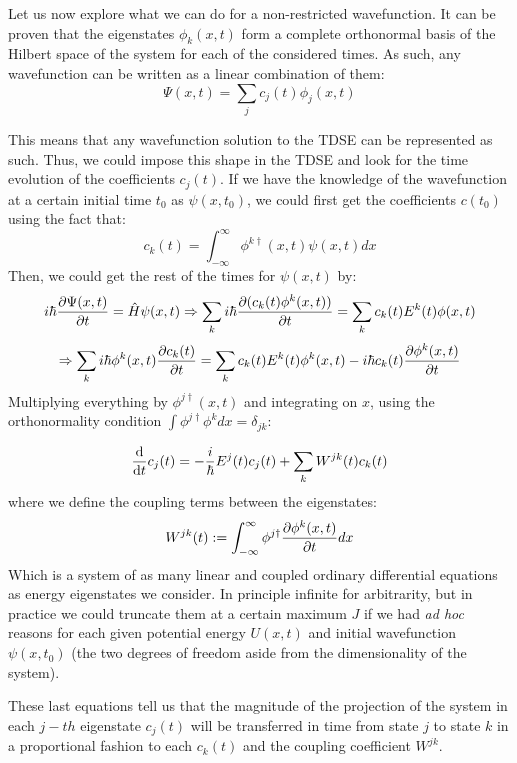 \documentclass[11pt, a4paper]{article} %
\begin{document}
Let us now explore what we can do for a non-restricted wavefunction. It can be proven that the eigenstates $\phi_k(x,t)$ form a complete orthonormal basis of the Hilbert space of the system for each of the considered times. As such, any wavefunction can be written as a linear combination of them:
\begin{equation}
\Psi(x,t)=\sum_j c_j(t)\phi_j(x,t)
\end{equation}

This means that any wavefunction solution to the TDSE can be represented as such. Thus, we could impose this shape in the TDSE and look for the time evolution of the coefficients $c_j(t)$. If we have the knowledge of the wavefunction at a certain initial time $t_0$ as $\psi(x,t_0)$, we could first get the coefficients $c(t_0)$ using the fact that:
\begin{equation}
c_k(t)=\int_{-\infty}^\infty\phi^{k \dagger}(x,t) \psi(x,t) dx
\end{equation}
Then, we could get the rest of the times for $\psi(x,t)$ by:
\begin{equation} \label{EigenE}
i\hbar \pdv{\Psi(x,t)}{t}=\hat{H}\psi(x,t)\Rightarrow \sum_k i\hbar \pdv{(c_k(t)\phi^k(x,t))}{t}=\sum_k c_k(t)E^k(t)\phi(x,t) 
\end{equation}
$$
\Rightarrow \sum_k i\hbar \phi^k(x,t)\pdv{c_k(t)}{t}= \sum_k c_k(t)E^k(t)\phi^k(x,t)-i\hbar  c_k(t)\pdv{\phi^k(x,t)}{t}
$$
Multiplying everything by $\phi^{j \dagger}(x,t)$ and integrating on $x$, using the orthonormality condition $\int\phi^{j \dagger} \phi^k dx=\delta_{jk}$:

\begin{equation} \label{CoeffsMagic}
\dv{}{t}c_j(t)=-\frac{i}{\hbar}E^j(t) c_j(t) + \sum_k W^{jk}(t)c_k(t)
\end{equation}
where we define the coupling terms between the eigenstates:
\begin{equation}
W^{jk}(t):=\int_{-\infty}^\infty\phi^{j \dagger} \pdv{\phi^k(x,t)}{t} dx
\end{equation}
Which is a system of as many linear and coupled ordinary differential equations as energy eigenstates we consider. In principle infinite for arbitrarity, but in practice we could truncate them at a certain maximum $J$ if we had {\em ad hoc} reasons for each given potential energy $U(x,t)$ and initial wavefunction $\psi(x,t_0)$ (the two degrees of freedom aside from the dimensionality of the system).

These last equations tell us that the magnitude of the projection of the system in each $j-th$ eigenstate $c_j(t)$ will be transferred in time from state $j$ to state $k$ in a proportional fashion to each $c_k(t)$ and the coupling coefficient $W^{jk}$.
\end{document}
